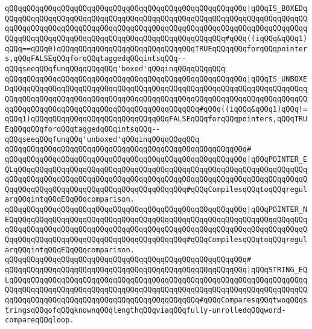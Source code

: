 \verb|qQQqqQQqqQQqqQQqqQQqqQQqqQQqqQQqqQQqqQQqqQQqqQQqqQQqqQQq|\verb#|qQQqIS_BOXEDqQQqqQQqqQQqqQQqqQQqqQQqqQQqqQQqqQQqqQQqqQQqqQQqqQQqqQQqqQQqqQQqqQQqqQQqqQQqqQQqqQQqqQQqqQQqqQQqqQQqqQQqqQQqqQQqqQQqqQQqqQQqqQQqqQQqqQQqqQQqqQQqqQQqqQQqqQQqqQQqqQQqqQQqqQQqqQQqqQQqqQQqqQQqqQQq#\verb|#qQQq((iqQQq&qQQq1)qQQq==qQQq0)qQQqqQQqqQQqqQQqqQQqqQQqqQQqqQQqTRUEqQQqqQQqforqQQqpointers,qQQqFALSEqQQqforqQQqtaggedqQQqintsqQQq--qQQqseeqQQqfunqQQqqQQqqQQq'boxed'qQQqinqQQqqQQqqQQq|\newline
\verb|qQQqqQQqqQQqqQQqqQQqqQQqqQQqqQQqqQQqqQQqqQQqqQQqqQQqqQQq|\verb#|qQQqIS_UNBOXEDqQQqqQQqqQQqqQQqqQQqqQQqqQQqqQQqqQQqqQQqqQQqqQQqqQQqqQQqqQQqqQQqqQQqqQQqqQQqqQQqqQQqqQQqqQQqqQQqqQQqqQQqqQQqqQQqqQQqqQQqqQQqqQQqqQQqqQQqqQQqqQQqqQQqqQQqqQQqqQQqqQQqqQQqqQQqqQQqqQQqqQQq#\verb|#qQQq((iqQQq&qQQq1)qQQq!=qQQq1)qQQqqQQqqQQqqQQqqQQqqQQqqQQqqQQqFALSEqQQqforqQQqpointers,qQQqTRUEqQQqqQQqforqQQqtaggedqQQqintsqQQq--qQQqseeqQQqfunqQQq'unboxed'qQQqinqQQqqQQqqQQq|\newline
\verb|qQQqqQQqqQQqqQQqqQQqqQQqqQQqqQQqqQQqqQQqqQQqqQQqqQQqqQQq#|\newline
\verb|qQQqqQQqqQQqqQQqqQQqqQQqqQQqqQQqqQQqqQQqqQQqqQQqqQQqqQQq|\verb#|qQQqPOINTER_EQLqQQqqQQqqQQqqQQqqQQqqQQqqQQqqQQqqQQqqQQqqQQqqQQqqQQqqQQqqQQqqQQqqQQqqQQqqQQqqQQqqQQqqQQqqQQqqQQqqQQqqQQqqQQqqQQqqQQqqQQqqQQqqQQqqQQqqQQqqQQqqQQqqQQqqQQqqQQqqQQqqQQqqQQqqQQqqQQqqQQq#\verb|#qQQqCompilesqQQqtoqQQqregularqQQqintqQQqEQqQQqcomparison.|\newline
\verb|qQQqqQQqqQQqqQQqqQQqqQQqqQQqqQQqqQQqqQQqqQQqqQQqqQQqqQQq|\verb#|qQQqPOINTER_NEQqQQqqQQqqQQqqQQqqQQqqQQqqQQqqQQqqQQqqQQqqQQqqQQqqQQqqQQqqQQqqQQqqQQqqQQqqQQqqQQqqQQqqQQqqQQqqQQqqQQqqQQqqQQqqQQqqQQqqQQqqQQqqQQqqQQqqQQqqQQqqQQqqQQqqQQqqQQqqQQqqQQqqQQqqQQqqQQqqQQq#\verb|#qQQqCompilesqQQqtoqQQqregularqQQqintqQQqEQqQQqcomparison.|\newline
\verb|qQQqqQQqqQQqqQQqqQQqqQQqqQQqqQQqqQQqqQQqqQQqqQQqqQQqqQQq#|\newline
\verb|qQQqqQQqqQQqqQQqqQQqqQQqqQQqqQQqqQQqqQQqqQQqqQQqqQQqqQQq|\verb#|qQQqSTRING_EQLqQQqqQQqqQQqqQQqqQQqqQQqqQQqqQQqqQQqqQQqqQQqqQQqqQQqqQQqqQQqqQQqqQQqqQQqqQQqqQQqqQQqqQQqqQQqqQQqqQQqqQQqqQQqqQQqqQQqqQQqqQQqqQQqqQQqqQQqqQQqqQQqqQQqqQQqqQQqqQQqqQQqqQQqqQQqqQQqqQQqqQQq#\verb|#qQQqComparesqQQqtwoqQQqstringsqQQqofqQQqknownqQQqlengthqQQqviaqQQqfully-unrolledqQQqword-compareqQQqloop.|\newline
